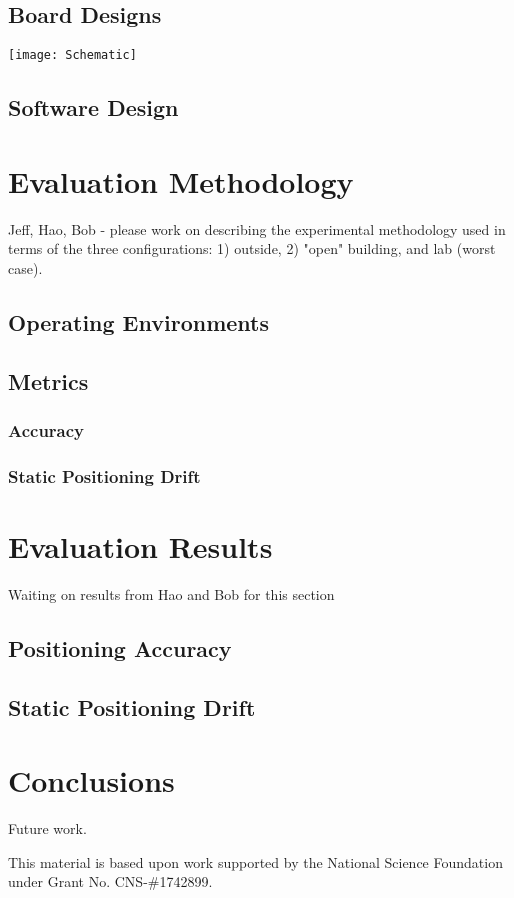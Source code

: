 \documentclass[sigconf]{acmart}
\begin{document}
\subsection{Board Designs} 
\texttt{[image: Schematic]}

\subsection{Software Design}

\section{Evaluation Methodology}

Jeff, Hao, Bob - please work on describing the experimental methodology used in terms of the three configurations:  1) outside, 2) "open" building, and lab (worst case).  

\subsection{Operating Environments}

\subsection{Metrics}

\subsubsection{Accuracy}

\subsubsection{Static Positioning Drift}



\section{Evaluation Results}

Waiting on results from Hao and Bob for this section 

\subsection{Positioning Accuracy}

\subsection{Static Positioning Drift}




\section{Conclusions}

Future work. 




\begin{acks}
  This material is based upon work supported by the National Science Foundation under Grant No. CNS-\#1742899.  

\end{acks}




\end{document}
